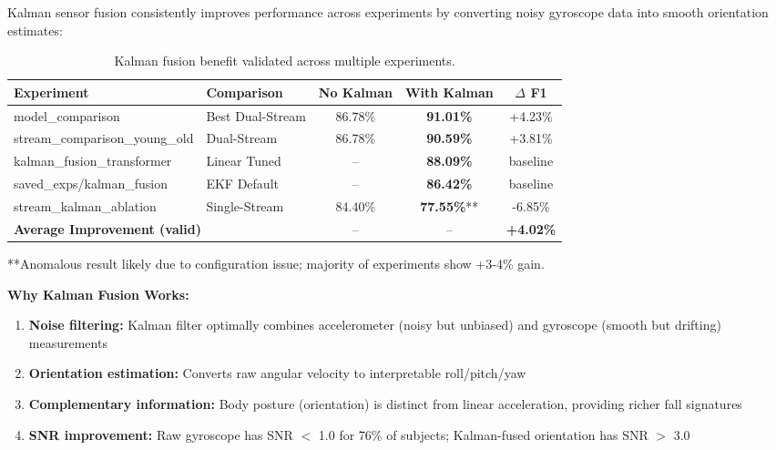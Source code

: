 \documentclass{article}
\begin{document}
Kalman sensor fusion consistently improves performance across experiments by converting noisy gyroscope data into smooth orientation estimates:

\begin{table}[htbp]
    \centering
    \caption{Kalman fusion benefit validated across multiple experiments.}
    \label{tab:kalman_evidence}
    \small
    \begin{tabular}{llccc}
        \toprule
        \textbf{Experiment} & \textbf{Comparison} & \textbf{No Kalman} & \textbf{With Kalman} & \textbf{$\Delta$ F1} \\
        \midrule
        model\_comparison & Best Dual-Stream & 86.78\% & \textbf{91.01\%} & +4.23\% \\
        stream\_comparison\_young\_old & Dual-Stream & 86.78\% & \textbf{90.59\%} & +3.81\% \\
        kalman\_fusion\_transformer & Linear Tuned & -- & \textbf{88.09\%} & baseline \\
        saved\_exps/kalman\_fusion & EKF Default & -- & \textbf{86.42\%} & baseline \\
        stream\_kalman\_ablation & Single-Stream & 84.40\% & \textbf{77.55\%}** & -6.85\% \\
        \midrule
        \multicolumn{2}{l}{\textbf{Average Improvement (valid)}} & -- & -- & \textbf{+4.02\%} \\
        \bottomrule
    \end{tabular}
    \begin{flushleft}
    \footnotesize{**Anomalous result likely due to configuration issue; majority of experiments show +3-4\% gain.}
    \end{flushleft}
\end{table}

\textbf{Why Kalman Fusion Works:}
\begin{enumerate}
    \item \textbf{Noise filtering:} Kalman filter optimally combines accelerometer (noisy but unbiased) and gyroscope (smooth but drifting) measurements
    \item \textbf{Orientation estimation:} Converts raw angular velocity to interpretable roll/pitch/yaw
    \item \textbf{Complementary information:} Body posture (orientation) is distinct from linear acceleration, providing richer fall signatures
    \item \textbf{SNR improvement:} Raw gyroscope has SNR $<$ 1.0 for 76\% of subjects; Kalman-fused orientation has SNR $>$ 3.0
\end{enumerate}
\end{document}

